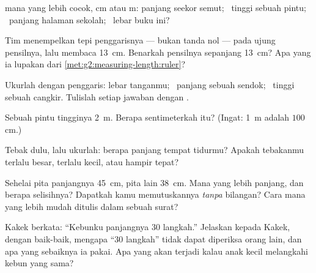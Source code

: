 \begin{exercise}[$\star$]\label{exo:g2:measuring-length:4}
 mana yang lebih cocok, \unit{cm} atau \unit{m}: panjang seekor
semut; \ tinggi sebuah pintu; \ panjang halaman sekolah; \ lebar buku
ini?
\end{exercise}

\begin{exercise}[$\star$]\label{exo:g2:measuring-length:5}
Tim menempelkan tepi penggarisnya --- bukan tanda nol --- pada ujung
pensilnya, lalu membaca \qty{13}{cm}. Benarkah pensilnya sepanjang
\qty{13}{cm}? Apa yang ia lupakan dari
\cref{met:g2:measuring-length:ruler}?
\end{exercise}

\begin{exercise}[$\star$]\label{exo:g2:measuring-length:6}
Ukurlah dengan penggaris: lebar tanganmu; \ panjang sebuah sendok;
\ tinggi sebuah cangkir. Tulislah setiap jawaban dengan .
\end{exercise}

\begin{exercise}[$\star$]\label{exo:g2:measuring-length:7}
Sebuah pintu tingginya \qty{2}{m}. Berapa sentimeterkah itu? (Ingat:
\qty{1}{m} adalah $100$ \unit{cm}.)
\end{exercise}

\begin{exercise}[$\star$]\label{exo:g2:measuring-length:8}
Tebak dulu, lalu ukurlah: berapa  panjang tempat tidurmu? Apakah
tebakanmu terlalu besar, terlalu kecil, atau hampir tepat?
\end{exercise}

\begin{exercise}[$\star\star$]\label{exo:g2:measuring-length:9}
Sehelai pita panjangnya \qty{45}{cm}, pita lain \qty{38}{cm}. Mana
yang lebih panjang, dan berapa  selisihnya? Dapatkah kamu
memutuskannya \emph{tanpa} bilangan? Cara mana yang lebih mudah
ditulis dalam sebuah surat?
\end{exercise}

\begin{exercise}[$\star\star$]\label{exo:g2:measuring-length:10}
Kakek berkata: ``Kebunku panjangnya $30$ langkah.'' Jelaskan kepada
Kakek, dengan baik-baik, mengapa ``$30$ langkah'' tidak dapat
diperiksa orang lain, dan apa yang sebaiknya ia pakai. Apa yang akan
terjadi kalau anak kecil melangkahi kebun yang sama?
\end{exercise}
